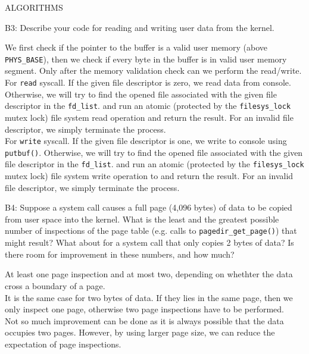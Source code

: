 \begin{aspect}{ALGORITHMS}
	\begin{qc}
		B3: Describe your code for reading and writing user data from the kernel.
	\end{qc}
	We first check if the pointer to the buffer is a valid user memory (above \lstinline{PHYS_BASE}),
	then we check if every byte in the buffer is in valid user memory segment.
	Only after the memory validation check can we perform the read/write.\\

	For \lstinline{read} syscall.
	If the given file descriptor is zero, we read data from console.
	Otherwise, we will try to find the opened file associated with the given file descriptor in the \lstinline{fd_list}.
	and run an atomic (protected by the \lstinline{filesys_lock} mutex lock) file system read operation and return the result.
	For an invalid file descriptor, we simply terminate the process.\\
	For \lstinline{write} syscall.
	If the given file descriptor is one, we write to console using \lstinline{putbuf()}.
	Otherwise, we will try to find the opened file associated with the given file descriptor in the \lstinline{fd_list}.
	and run an atomic (protected by the \lstinline{filesys_lock} mutex lock) file system write operation to and return the result.
	For an invalid file descriptor, we simply terminate the process.\\

	\begin{qc}
		B4: Suppose a system call causes a full page (4,096 bytes) of data to be copied from user space into the kernel.
		What is the least and the greatest possible number of inspections of the page table (e.g. calls to \lstinline{pagedir_get_page()}) that might result?
		What about for a system call that only copies 2 bytes of data?
		Is there room for improvement in these numbers, and how much?
	\end{qc}
	At least one page inspection and at most two, depending on whethter the data cross a boundary of a page.\\
	It is the same case for two bytes of data.
	If they lies in the same page, then we only inspect one page, otherwise two page inspections have to be performed.\\

	Not so much improvement can be done as it is always possible that the data occupies two pages.
	However, by using larger page size, we can reduce the expectation of page inspections.


\end{aspect}

